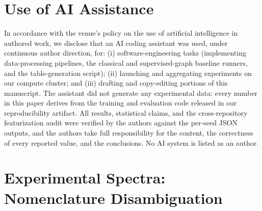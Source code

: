 \documentclass[sigconf,nonacm,anonymous,review]{acmart}
\begin{document}
\section*{Use of AI Assistance}
\label{sec:ai-disclosure}
In accordance with the venue's policy on the use of artificial intelligence in
authored work, we disclose that an AI coding assistant was used, under
continuous author direction, for: (i) software-engineering tasks (implementing
data-processing pipelines, the classical and supervised-graph baseline runners,
and the table-generation script); (ii) launching and aggregating experiments on
our compute cluster; and (iii) drafting and copy-editing portions of this
manuscript. The assistant did not generate any experimental data: every number
in this paper derives from the training and evaluation code released in our
reproducibility artifact. All results, statistical claims, and the
cross-repository featurization audit were verified by the authors against the
per-seed JSON outputs, and the authors take full responsibility for the
content, the correctness of every reported value, and the conclusions. No AI
system is listed as an author.





\appendix

\section{Experimental Spectra: Nomenclature Disambiguation}
\end{document}

